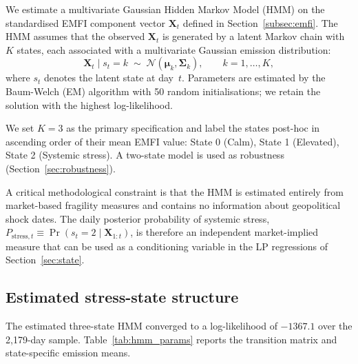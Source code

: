 \documentclass[11pt]{article}
\begin{document}
We estimate a multivariate Gaussian Hidden Markov Model (HMM) on the
standardised EMFI component vector $\mathbf{X}_t$ defined in
Section~\ref{subsec:emfi}.
The HMM assumes that the observed $\mathbf{X}_t$ is generated by a latent
Markov chain with $K$ states, each associated with a multivariate Gaussian
emission distribution:
\begin{equation}
  \mathbf{X}_t \mid s_t = k \;\sim\; \mathcal{N}(\boldsymbol{\mu}_k, \boldsymbol{\Sigma}_k),
  \qquad k = 1, \ldots, K,
\end{equation}
where $s_t$ denotes the latent state at day~$t$.
Parameters are estimated by the Baum-Welch (EM) algorithm with 50 random
initialisations; we retain the solution with the highest log-likelihood.

We set $K = 3$ as the primary specification and label the states post-hoc
in ascending order of their mean EMFI value: State 0 (Calm), State 1
(Elevated), State 2 (Systemic stress).
A two-state model is used as robustness (Section~\ref{sec:robustness}).

A critical methodological constraint is that the HMM is estimated entirely
from market-based fragility measures and contains no information about
geopolitical shock dates.
The daily posterior probability of systemic stress,
$P_{\text{stress},t} \equiv \Pr(s_t = 2 \mid \mathbf{X}_{1:t})$,
is therefore an independent market-implied measure that can be used as
a conditioning variable in the LP regressions of Section~\ref{sec:state}.

\subsection{Estimated stress-state structure}
\label{subsec:hmm_results}

The estimated three-state HMM converged to a log-likelihood of $-1367.1$
over the 2,179-day sample.
Table~\ref{tab:hmm_params} reports the transition matrix and state-specific
emission means.
\end{document}
